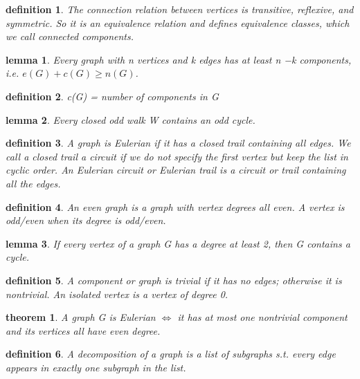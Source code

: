 \documentclass[2pt]{article}
\newtheorem{theorem}{theorem}[section]  %
\newtheorem{definition}{definition}
\newtheorem{lemma}{lemma}
\begin{document}
\begin{CJK*}{UTF8}{bkai}
\begin{paracol}{2}
    \begin{definition}
        The connection relation between vertices is transitive, reflexive, and
 symmetric. So it is an equivalence relation and defines equivalence classes,
 which we call connected components.
    \end{definition}

    \begin{lemma}
         Every graph with n vertices and k edges has at least n −k components, i.e.
 $e(G) +c(G) \geq n(G)$.
    \end{lemma}

    \begin{definition}
         c(G) = number of components in G
    \end{definition}

    \begin{lemma}
         Every closed odd walk W contains an odd cycle.
    \end{lemma}

    \begin{definition}
        A graph is Eulerian if it has a closed trail containing all edges. We call a
 closed trail a circuit if we do not specify the first vertex but keep the list in
 cyclic order. An Eulerian circuit or Eulerian trail is a circuit or trail
 containing all the edges.
    \end{definition}

    \begin{definition}
        An even graph is a graph with vertex degrees all even. A vertex is odd/even
 when its degree is odd/even.
    \end{definition}

    \begin{lemma}
        If every vertex of a graph G has a degree at least 2, then G contains a cycle.
    \end{lemma}

    \begin{definition}
         A component or graph is trivial if it has no edges; otherwise it is nontrivial.
 An isolated vertex is a vertex of degree 0.
    \end{definition}

    \begin{theorem}
        A graph G is Eulerian $\iff$ it has at most one nontrivial component and its
 vertices all have even degree.
    \end{theorem}
    
    \begin{definition}
        A decomposition of a graph is a list of subgraphs s.t. every edge appears in
 exactly one subgraph in the list.
    \end{definition}


\end{paracol}
\end{CJK*}
\end{document}
